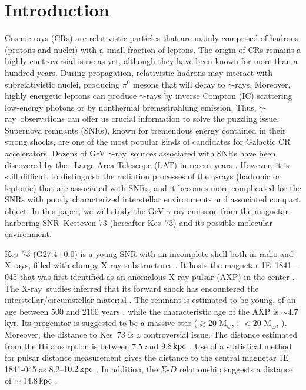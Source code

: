 \documentclass[12pt,preprint]{aastex}
\newcommand{\xray}{{\rm X-ray}}  \newcommand{\Einstein}{{\sl Einstein}}
\newcommand{\HI}{{\ion{H}{1}}}
\newcommand{\gray}{{\rm $\gamma$-ray}}
\begin{document}
\section{Introduction}
\label{sec:intro}
Cosmic rays (CRs) are relativistic particles 
that are mainly comprised of hadrons (protons and nuclei) with a
small fraction of leptons. The origin of CRs remains 
a highly controversial issue as yet, although they have been known for 
more than a hundred years.
During propagation, relativistic hadrons 
may interact with subrelativistic nuclei, 
producing $\pi^0$ mesons that will decay to {\gray}s.
Moreover, highly energetic leptons can produce {\gray}s 
by inverse Compton (IC) scattering low-energy photons or 
by nonthermal bremsstrahlung emission.
Thus, \gray\ observations can offer us crucial information 
to solve the puzzling issue.  
Supernova remnants (SNRs), known for tremendous energy 
contained in their strong shocks, are one of the most popular kinds of 
candidates for  Galactic CR  accelerators.
Dozens of GeV \gray\ sources associated with SNRs %
have been discovered by the  \Fermi\ Large Area Telescope (LAT) in recent years 
\citep[e.g.,][]{Abdo2009W51C,Abdo2010W44SCi,1fsnr}.
However, it is still difficult to distinguish the 
radiation processes of the {\gray}s (hadronic or leptonic)
 that are associated with SNRs,
and it becomes more complicated for the SNRs with  poorly characterized
interstellar environments and associated compact object.
%
In this paper, we will study the GeV $\gamma$-ray emission from
the magnetar-harboring SNR~Kesteven 73 (hereafter Kes~73)
and its possible molecular environment.

Kes~73 (G27.4$+$0.0) is a young SNR with an incomplete shell both in radio and \xray{s},
filled with clumpy X-ray substructures \citep{Helfand1994kes73,Kumar2014kes73}.
It hosts the magnetar 1E~1841$-$045 
that was first identified as  an  anomalous X-ray pulsar (AXP)  in the center
\citep{Vasisht1997kes73}.
The \xray\ studies  %
inferred that its forward shock has encountered the interstellar/circumstellar material
\citep{Kumar2014kes73, Borkowski2017}.
The remnant is estimated to be young, of an age between 500 and 2100 years
\citep{Tian2008kes73, Kumar2014kes73,Gao2016mn,Borkowski2017},
while the characteristic age of the AXP is $\sim4.7$ kyr.
Its progenitor is suggested to be a massive star %
($\gtrsim20$ M$_{\odot}$, \citealt{Kumar2014kes73};  
$<20$ M$_{\odot}$, \citealt{Borkowski2017}).
Moreover,  the distance   to Kes~73 is a controversial issue.
The distance estimated from the H\,{\sc i} absorption is
between $7.5$ and $9.8\,{\rm kpc}$ \citep{Tian2008kes73}. 
Use of a statistical method for pulsar distance measurement
gives the distance to the central magnetar 1E 1841-045
as $8.2$--$10.2\,{\rm kpc}$ \citep{Verbiest2012}. 
In addition, the $\Sigma$-$D$ relationship suggests a distance of 
$\sim14.8\,{\rm kpc}$ \citep{Pavlovic2014}. 
\end{document}
